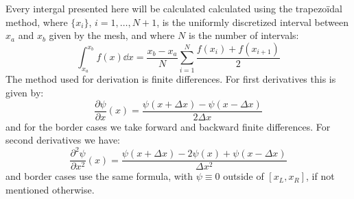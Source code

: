 Every intergal presented here will be calculated calculated using the trapezoïdal method, where \(\{x_i\}\), \(i = 1, \dots, N+1\), is the uniformly discretized interval between \(x_a\) and \(x_b\) given by the mesh, and where \(N\) is the number of intervals:
\begin{equation}
    \int_{x_a}^{x_b} f(x) \dd x = \frac{x_b - x_a}{N} \sum_{i=1}^N \frac{f(x_i) + f(x_{i+1})}{2}
\end{equation}
The method used for derivation is finite differences. For first derivatives this is given by:
\begin{equation}
    \frac{\partial \psi}{\partial x}(x) = \frac{\psi(x+\Delta x) - \psi(x - \Delta x)}{2\Delta x}
\end{equation}
and for the border cases we take forward and backward finite differences. For second derivatives we have:
\begin{equation}
    \frac{\partial^2 \psi}{\partial x^2}(x) = \frac{\psi(x+\Delta x) - 2\psi(x) + \psi(x - \Delta x)}{\Delta x^2}
    \label{eq:second_derivative}
\end{equation}
and border cases use the same formula, with $\psi \equiv 0$ outside of $[x_L,x_R]$, if not mentioned otherwise.

